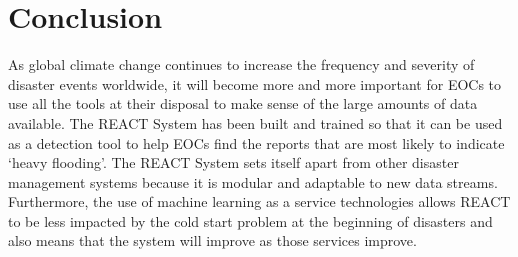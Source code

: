 \section{Conclusion}
As global climate change continues to increase the frequency and severity of
disaster events worldwide, it will become more and more important for EOCs to
use all the tools at their disposal to make sense of the large amounts of data
available.
The REACT System has been built and trained so that it can be used as
a detection tool to help EOCs find the reports that are most likely to indicate
`heavy flooding'. The REACT System sets itself apart from other disaster
management systems because it is modular and adaptable to new data streams.
Furthermore, the use of machine learning as a service technologies allows REACT
to be less impacted by the cold start problem at the beginning of disasters and
also means that the system will improve as those services improve. 
